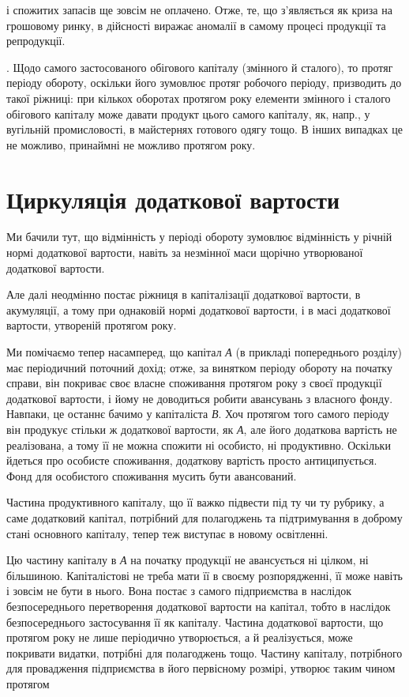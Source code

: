 \parcont{}  %
і спожитих запасів ще зовсім не оплачено. Отже, те, що з’являється
як криза на грошовому ринку, в дійсності виражає аномалії в самому процесі
продукції та репродукції.

. Щодо самого застосованого обігового капіталу (змінного
й сталого), то протяг періоду обороту, оскільки його зумовлює протяг
робочого періоду, призводить до такої ріжниці: при кількох оборотах
протягом року елементи змінного і сталого обігового капіталу може
давати продукт цього самого капіталу, як, напр., у вугільній промисловості,
в майстернях готового одягу тощо. В інших випадках це не можливо,
принаймні не можливо протягом року.

\section{Циркуляція додаткової вартости}

Ми бачили тут, що відмінність у періоді обороту зумовлює відмінність
у річній нормі додаткової вартости, навіть за незмінної маси щорічно
утворюваної додаткової вартости.

Але далі неодмінно постає ріжниця в капіталізації додаткової вартости,
в акумуляції, а тому при однаковій нормі додаткової вартости,
і в масі додаткової вартости, утвореній протягом року.

Ми помічаємо тепер насамперед, що капітал \emph{А} (в прикладі попереднього
розділу) має періодичний поточний дохід; отже, за винятком періоду
обороту на початку справи, він покриває своє власне споживання
протягом року з своєї продукції додаткової вартости, і йому не доводиться
робити авансувань з власного фонду. Навпаки, це останнє
бачимо у капіталіста \emph{В}. Хоч протягом того самого періоду він продукує
стільки ж додаткової вартости, як \emph{А}, але його додаткова вартість не
реалізована, а тому її не можна спожити ні особисто, ні продуктивно. Оскільки
йдеться про особисте споживання, додаткову вартість просто антиципується.
Фонд для особистого споживання мусить бути авансований.

Частина продуктивного капіталу, що її важко підвести під ту чи ту
рубрику, а саме додатковий капітал, потрібний для полагоджень та підтримування
в доброму стані основного капіталу, тепер теж виступає в
новому освітленні.

Цю частину капіталу в \emph{А} на початку продукції не авансується ні
цілком, ні більшиною. Капіталістові не треба мати її в своєму розпорядженні,
її може навіть і зовсім не бути в нього. Вона постає з самого
підприємства в наслідок безпосереднього перетворення додаткової вартости
на капітал, тобто в наслідок безпосереднього застосування її як капіталу.
Частина додаткової вартости, що протягом року не лише періодично
утворюється, а й реалізується, може покривати видатки, потрібні для
полагоджень тощо. Частину капіталу, потрібного для провадження підприємства
в його первісному розмірі, утворює таким чином протягом
\parbreak{}  %
